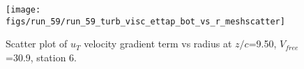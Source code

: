 \begin{figure}[H]
\centering
\texttt{[image: figs/run\_59/run\_59\_turb\_visc\_ettap\_bot\_vs\_r\_meshscatter]}
\caption{Scatter plot of $
u_T$ velocity gradient term vs radius at $z/c$=9.50, $V_{free}$=30.9, station 6.}
\end{figure}


